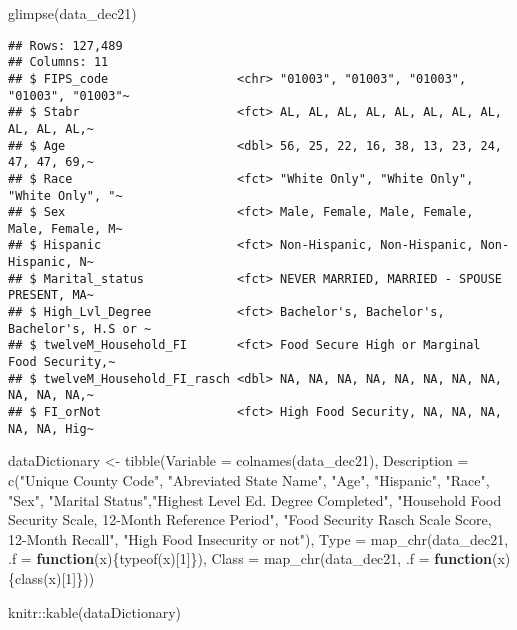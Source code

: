 \documentclass[
]{article}
\newenvironment{Shaded}{\begin{snugshade}}{\end{snugshade}}
\newcommand{\AttributeTok}[1]{\textcolor[rgb]{0.77,0.63,0.00}{#1}}
\newcommand{\ControlFlowTok}[1]{\textcolor[rgb]{0.13,0.29,0.53}{\textbf{#1}}}
\newcommand{\DecValTok}[1]{\textcolor[rgb]{0.00,0.00,0.81}{#1}}
\newcommand{\FunctionTok}[1]{\textcolor[rgb]{0.00,0.00,0.00}{#1}}
\newcommand{\NormalTok}[1]{#1}
\newcommand{\OtherTok}[1]{\textcolor[rgb]{0.56,0.35,0.01}{#1}}
\newcommand{\SpecialCharTok}[1]{\textcolor[rgb]{0.00,0.00,0.00}{#1}}
\newcommand{\StringTok}[1]{\textcolor[rgb]{0.31,0.60,0.02}{#1}}
\begin{document}
\begin{Shaded}
\begin{Highlighting}[]
\FunctionTok{glimpse}\NormalTok{(data\_dec21)}
\end{Highlighting}
\end{Shaded}

\begin{verbatim}
## Rows: 127,489
## Columns: 11
## $ FIPS_code                  <chr> "01003", "01003", "01003", "01003", "01003"~
## $ Stabr                      <fct> AL, AL, AL, AL, AL, AL, AL, AL, AL, AL, AL,~
## $ Age                        <dbl> 56, 25, 22, 16, 38, 13, 23, 24, 47, 47, 69,~
## $ Race                       <fct> "White Only", "White Only", "White Only", "~
## $ Sex                        <fct> Male, Female, Male, Female, Male, Female, M~
## $ Hispanic                   <fct> Non-Hispanic, Non-Hispanic, Non-Hispanic, N~
## $ Marital_status             <fct> NEVER MARRIED, MARRIED - SPOUSE PRESENT, MA~
## $ High_Lvl_Degree            <fct> Bachelor's, Bachelor's, Bachelor's, H.S or ~
## $ twelveM_Household_FI       <fct> Food Secure High or Marginal Food Security,~
## $ twelveM_Household_FI_rasch <dbl> NA, NA, NA, NA, NA, NA, NA, NA, NA, NA, NA,~
## $ FI_orNot                   <fct> High Food Security, NA, NA, NA, NA, NA, Hig~
\end{verbatim}

\begin{Shaded}
\begin{Highlighting}[]
\NormalTok{dataDictionary }\OtherTok{\textless{}{-}} \FunctionTok{tibble}\NormalTok{(}\AttributeTok{Variable =} \FunctionTok{colnames}\NormalTok{(data\_dec21),}
                         \AttributeTok{Description =} \FunctionTok{c}\NormalTok{(}\StringTok{"Unique County Code"}\NormalTok{, }\StringTok{"Abreviated State Name"}\NormalTok{, }\StringTok{"Age"}\NormalTok{, }\StringTok{"Hispanic"}\NormalTok{, }\StringTok{"Race"}\NormalTok{, }\StringTok{"Sex"}\NormalTok{, }\StringTok{"Marital Status"}\NormalTok{,}\StringTok{"Highest Level Ed. Degree Completed"}\NormalTok{, }\StringTok{"Household Food Security Scale, 12{-}Month Reference Period"}\NormalTok{, }\StringTok{"Food Security Rasch Scale Score, 12{-}Month Recall"}\NormalTok{, }\StringTok{"High Food Insecurity or not"}\NormalTok{),}
                         \AttributeTok{Type =} \FunctionTok{map\_chr}\NormalTok{(data\_dec21, }\AttributeTok{.f =} \ControlFlowTok{function}\NormalTok{(x)\{}\FunctionTok{typeof}\NormalTok{(x)[}\DecValTok{1}\NormalTok{]\}),}
                         \AttributeTok{Class =} \FunctionTok{map\_chr}\NormalTok{(data\_dec21, }\AttributeTok{.f =} \ControlFlowTok{function}\NormalTok{(x)\{}\FunctionTok{class}\NormalTok{(x)[}\DecValTok{1}\NormalTok{]\}))}

\NormalTok{knitr}\SpecialCharTok{::}\FunctionTok{kable}\NormalTok{(dataDictionary)}
\end{Highlighting}
\end{Shaded}
\end{document}
